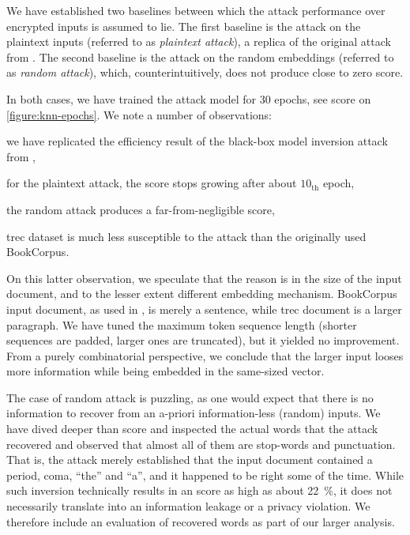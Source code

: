 				We have established two baselines between which the attack performance over encrypted inputs is assumed to lie.
				The first baseline is the attack on the plaintext inputs (referred to as \emph{plaintext attack}), a replica of the original attack from \cite{embedding-attacks}.
				The second baseline is the attack on the random embeddings (referred to as \emph{random attack}), which, counterintuitively, does not produce close to zero \FOne{} score.

				In both cases, we have trained the attack model for 30 epochs, see \FOne{} score on \cref{figure:knn-epochs}.
				We note a number of observations:
				\begin{enumerate*}[label={(\roman*)}]
					\item we have replicated the efficiency result of the black-box model inversion attack from \cite[Table 2, \FOne{} score, same domain, $\mathcal{L}_{\text{\acrshort{msp}}}$, \acrshort{bert}]{embedding-attacks},
					\item for the plaintext attack, the \FOne{} score stops growing after about $10_\text{th}$ epoch,
					\item the random attack produces a far-from-negligible \FOne{} score,
					\item \acrshort{trec} dataset is much less susceptible to the attack than the originally used BookCorpus.
				\end{enumerate*}

				On this latter observation, we speculate that the reason is in the size of the input document, and to the lesser extent different embedding mechanism.
				BookCorpus input document, as used in \cite{embedding-attacks}, is merely a sentence, while \acrshort{trec} document is a larger paragraph.
				We have tuned the maximum token sequence length (shorter sequences are padded, larger ones are truncated), but it yielded no improvement.
				From a purely combinatorial perspective, we conclude that the larger input looses more information while being embedded in the same-sized vector.

				The case of random attack is puzzling, as one would expect that there is no information to recover from an a-priori information-less (random) inputs.
				We have dived deeper than \FOne{} score and inspected the actual words that the attack recovered and observed that almost all of them are stop-words and punctuation.
				That is, the attack merely established that the input document contained a period, coma, ``the'' and ``a'', and it happened to be right some of the time.
				While such inversion technically results in an \FOne{} score as high as about \SI{22}{\percent}, it does not necessarily translate into an information leakage or a privacy violation.
				We therefore include an evaluation of recovered words as part of our larger analysis.


